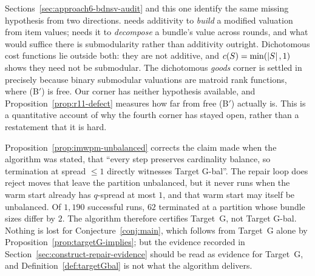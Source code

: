 \begin{remark}
\label{rem:submodular-is-the-gap}
Sections~\ref{sec:approach6-bdnsv-audit} and this one identify the same missing
hypothesis from two directions. \cite{BDNSV20} needs additivity to \emph{build} a
modified valuation from item values; \cite{LMS26} needs it to \emph{decompose} a
bundle's value across rounds, and what would suffice there is submodularity
rather than additivity outright. Dichotomous cost functions lie outside both:
they are not additive, and $c(S) = \min(\left\lvert S\right\rvert,1)$ shows they need not be
submodular. The dichotomous \emph{goods} corner is settled in~\cite{BKNS22}
precisely because binary submodular valuations are matroid rank functions, where
(B$'$) is free. Our corner has neither hypothesis available, and
Proposition~\ref{prop:r11-defect} measures how far from free (B$'$) actually is.
This is a quantitative account of why the fourth corner has stayed open, rather
than a restatement that it is hard.
\end{remark}

\begin{remark}
\label{rem:targetG-not-Gbal}
Proposition~\ref{prop:imwpm-unbalanced} corrects the claim made when the
algorithm was stated, that ``every step preserves cardinality balance, so
termination at spread $\le 1$ directly witnesses Target G-bal''. The repair loop
does reject moves that leave the partition unbalanced, but it never runs when the
warm start already has $q$-spread at most $1$, and that warm start may itself be
unbalanced. Of $1{,}190$ successful runs, $62$ terminated at a partition whose
bundle sizes differ by $2$. The algorithm therefore certifies Target~G, not
Target G-bal. Nothing is lost for Conjecture~\ref{conj:main}, which follows from
Target~G alone by Proposition~\ref{prop:targetG-implies}; but the evidence
recorded in Section~\ref{sec:construct-repair-evidence} should be read as
evidence for Target~G, and Definition~\ref{def:targetGbal} is not what the
algorithm delivers.
\end{remark}

